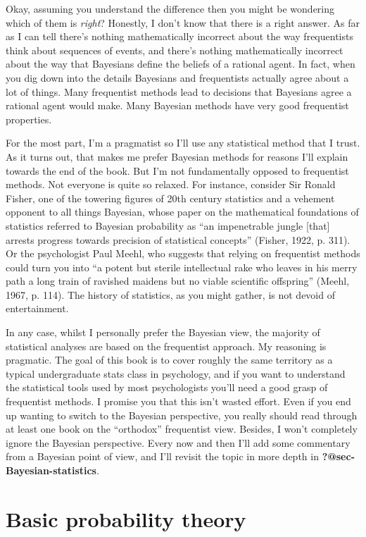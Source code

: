 \documentclass[
  a4paper,
]{book}
\begin{document}
Okay, assuming you understand the difference then you might be wondering
which of them is \emph{right}? Honestly, I don't know that there is a
right answer. As far as I can tell there's nothing mathematically
incorrect about the way frequentists think about sequences of events,
and there's nothing mathematically incorrect about the way that
Bayesians define the beliefs of a rational agent. In fact, when you dig
down into the details Bayesians and frequentists actually agree about a
lot of things. Many frequentist methods lead to decisions that Bayesians
agree a rational agent would make. Many Bayesian methods have very good
frequentist properties.

For the most part, I'm a pragmatist so I'll use any statistical method
that I trust. As it turns out, that makes me prefer Bayesian methods for
reasons I'll explain towards the end of the book. But I'm not
fundamentally opposed to frequentist methods. Not everyone is quite so
relaxed. For instance, consider Sir Ronald Fisher, one of the towering
figures of 20th century statistics and a vehement opponent to all things
Bayesian, whose paper on the mathematical foundations of statistics
referred to Bayesian probability as ``an impenetrable jungle {[}that{]}
arrests progress towards precision of statistical concepts'' (Fisher,
1922, p. 311). Or the psychologist Paul Meehl, who suggests that relying
on frequentist methods could turn you into ``a potent but sterile
intellectual rake who leaves in his merry path a long train of ravished
maidens but no viable scientific offspring'' (Meehl, 1967, p. 114). The
history of statistics, as you might gather, is not devoid of
entertainment.

In any case, whilst I personally prefer the Bayesian view, the majority
of statistical analyses are based on the frequentist approach. My
reasoning is pragmatic. The goal of this book is to cover roughly the
same territory as a typical undergraduate stats class in psychology, and
if you want to understand the statistical tools used by most
psychologists you'll need a good grasp of frequentist methods. I promise
you that this isn't wasted effort. Even if you end up wanting to switch
to the Bayesian perspective, you really should read through at least one
book on the ``orthodox'' frequentist view. Besides, I won't completely
ignore the Bayesian perspective. Every now and then I'll add some
commentary from a Bayesian point of view, and I'll revisit the topic in
more depth in \textbf{?@sec-Bayesian-statistics}.

\hypertarget{basic-probability-theory}{%
\section{Basic probability theory}\label{basic-probability-theory}}
\end{document}
